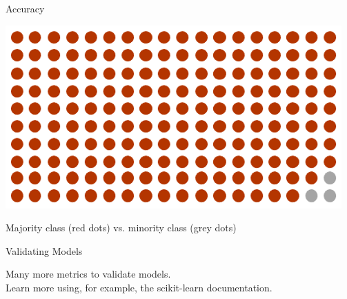 \documentclass[handout]{beamer}
\begin{document}
\begin{frame}{Accuracy}
	
	\begin{center}
		\includegraphics[width=\linewidth,height=\textheight,keepaspectratio]{../pictures/imbalance.png} 
	\end{center}	
	
	Majority class (red dots) vs. minority class (grey dots) 
	
	
	
\end{frame}



\begin{frame}{Validating Models}
	
	Many more metrics to validate models. \\
	
	Learn more using, for example, the scikit-learn documentation. 
	
\end{frame}
\end{document}
